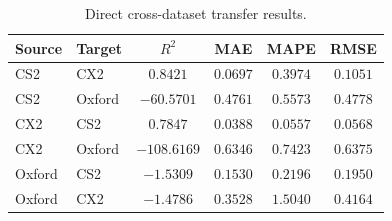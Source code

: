 \begin{table}[H]
\TableStyle
\caption{Direct cross-dataset transfer results.}
\label{tab:4-7}
\begin{tabularx}{\linewidth}{@{\extracolsep{\fill}}L{0.90}L{0.90}C{1.20}C{1.00}C{1.00}C{1.00}@{}}
\toprule
Source & Target & $R^2$ & MAE & MAPE & RMSE \\
\midrule
CS2 & CX2 & $0.8421$ & $0.0697$ & $0.3974$ & $0.1051$ \\
CS2 & Oxford & $-60.5701$ & $0.4761$ & $0.5573$ & $0.4778$ \\
CX2 & CS2 & $0.7847$ & $0.0388$ & $0.0557$ & $0.0568$ \\
CX2 & Oxford & $-108.6169$ & $0.6346$ & $0.7423$ & $0.6375$ \\
Oxford & CS2 & $-1.5309$ & $0.1530$ & $0.2196$ & $0.1950$ \\
Oxford & CX2 & $-1.4786$ & $0.3528$ & $1.5040$ & $0.4164$ \\
\bottomrule
\end{tabularx}
\end{table}
